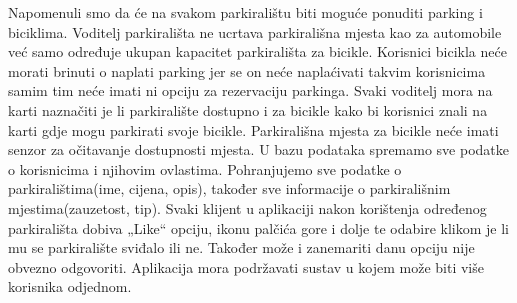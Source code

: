 Napomenuli smo da će na svakom parkiralištu biti moguće ponuditi parking i biciklima. Voditelj parkirališta ne ucrtava parkirališna mjesta kao za automobile već samo određuje ukupan kapacitet parkirališta za bicikle. Korisnici bicikla neće morati brinuti o naplati parking jer se on neće naplaćivati takvim korisnicima samim tim neće imati ni opciju za rezervaciju parkinga. Svaki voditelj mora na karti naznačiti je li parkiralište dostupno i za bicikle kako bi korisnici znali na karti gdje mogu parkirati svoje bicikle. Parkirališna mjesta za bicikle neće imati senzor za očitavanje dostupnosti mjesta. U bazu podataka spremamo sve podatke o korisnicima i njihovim ovlastima. Pohranjujemo sve podatke o parkiralištima(ime, cijena, opis), također sve informacije o parkirališnim mjestima(zauzetost, tip). Svaki klijent u aplikaciji nakon korištenja određenog parkirališta dobiva „Like“ opciju, ikonu palčića gore  i dolje te odabire klikom je li mu se parkiralište sviđalo ili ne. Također može i zanemariti danu opciju nije obvezno odgovoriti. Aplikacija mora podržavati sustav u kojem može biti više korisnika odjednom.


		\eject
		


		
